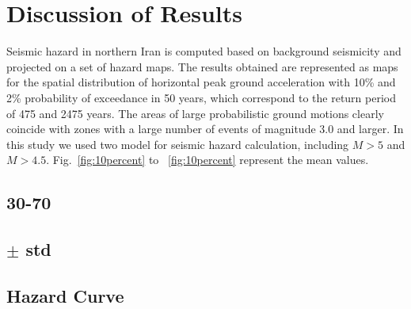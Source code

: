 \newpage
\section{Discussion of Results}
Seismic hazard in northern Iran is computed based on background seismicity and projected on a set of hazard maps. The results obtained are represented as maps for the spatial distribution of horizontal peak ground acceleration with 10\% and 2\% probability of exceedance in 50 years, which correspond to the return period of 475 and 2475 years. The areas of large probabilistic ground motions clearly coincide with zones with a large number of events of magnitude 3.0 and larger. In this study we used two model for seismic hazard calculation, including $M>5$ and $M>4.5$.
Fig.~\ref{fig:10percent} to ~\ref{fig:10percent} represent the mean values. 
\subsection{30-70}
\subsection{$\pm$ std}
\subsection{Hazard Curve}
